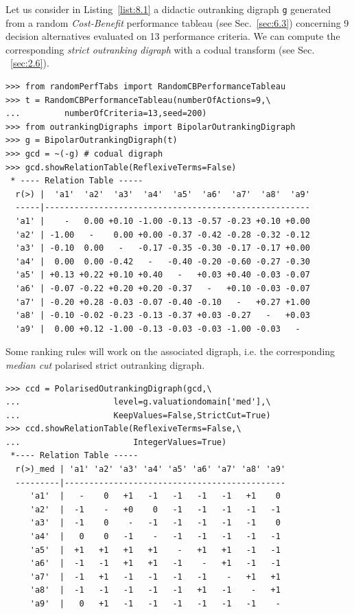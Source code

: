 Let us consider in Listing~\vref{list:8.1} a didactic outranking digraph \texttt{g} generated from a random \emph{Cost-Benefit} performance tableau (see Sec.~\ref{sec:6.3}) concerning 9 decision alternatives evaluated on 13 performance criteria. We can compute the corresponding \emph{strict outranking digraph} with a codual transform (see Sec. ~\ref{sec:2.6}).
\begin{lstlisting}[caption={Random bipolar-valued strict outranking relation characteristics},label=list:8.1]
>>> from randomPerfTabs import RandomCBPerformanceTableau   
>>> t = RandomCBPerformanceTableau(numberOfActions=9,\
...         numberOfCriteria=13,seed=200)
>>> from outrankingDigraphs import BipolarOutrankingDigraph
>>> g = BipolarOutrankingDigraph(t)
>>> gcd = ~(-g) # codual digraph
>>> gcd.showRelationTable(ReflexiveTerms=False)
 * ---- Relation Table -----
  r(>) |  'a1'  'a2'  'a3'  'a4'  'a5'  'a6'  'a7'  'a8'  'a9'   
  -----|------------------------------------------------------
  'a1' |    -   0.00 +0.10 -1.00 -0.13 -0.57 -0.23 +0.10 +0.00  
  'a2' | -1.00   -    0.00 +0.00 -0.37 -0.42 -0.28 -0.32 -0.12  
  'a3' | -0.10  0.00   -   -0.17 -0.35 -0.30 -0.17 -0.17 +0.00  
  'a4' |  0.00  0.00 -0.42   -   -0.40 -0.20 -0.60 -0.27 -0.30  
  'a5' | +0.13 +0.22 +0.10 +0.40   -   +0.03 +0.40 -0.03 -0.07  
  'a6' | -0.07 -0.22 +0.20 +0.20 -0.37   -   +0.10 -0.03 -0.07  
  'a7' | -0.20 +0.28 -0.03 -0.07 -0.40 -0.10   -   +0.27 +1.00  
  'a8' | -0.10 -0.02 -0.23 -0.13 -0.37 +0.03 -0.27   -   +0.03  
  'a9' |  0.00 +0.12 -1.00 -0.13 -0.03 -0.03 -1.00 -0.03   -   
\end{lstlisting}
  
Some ranking rules will work on the associated \Condorcet digraph, i.e. the corresponding \emph{median cut} polarised strict outranking digraph.
 \begin{lstlisting}[caption={Median cut polarised strict outranking relation characteristics},label=list:8.2]
>>> ccd = PolarisedOutrankingDigraph(gcd,\
...                   level=g.valuationdomain['med'],\
...                   KeepValues=False,StrictCut=True)
>>> ccd.showRelationTable(ReflexiveTerms=False,\
...                       IntegerValues=True)
 *---- Relation Table -----
  r(>)_med | 'a1' 'a2' 'a3' 'a4' 'a5' 'a6' 'a7' 'a8' 'a9'   
  ---------|---------------------------------------------
     'a1'  |   -    0   +1   -1   -1   -1   -1   +1    0  
     'a2'  |  -1    -   +0    0   -1   -1   -1   -1   -1  
     'a3'  |  -1    0    -   -1   -1   -1   -1   -1    0  
     'a4'  |   0    0   -1    -   -1   -1   -1   -1   -1  
     'a5'  |  +1   +1   +1   +1    -   +1   +1   -1   -1  
     'a6'  |  -1   -1   +1   +1   -1    -   +1   -1   -1  
     'a7'  |  -1   +1   -1   -1   -1   -1    -   +1   +1  
     'a8'  |  -1   -1   -1   -1   -1   +1   -1    -   +1  
     'a9'  |   0   +1   -1   -1   -1   -1   -1   -1    -   
\end{lstlisting}

